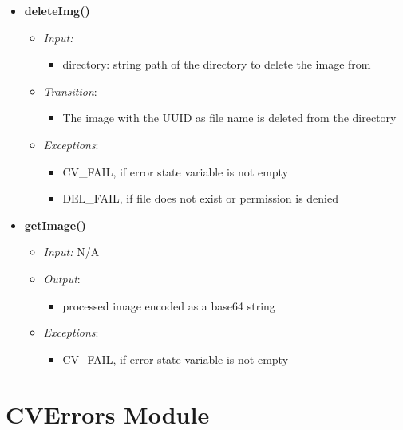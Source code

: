 \documentclass[11pt]{article}
\begin{document}
\begin{itemize}
		\item \textbf{deleteImg()}
		\begin{itemize}
		    \item[] \textit{Input: } 		    
		    \begin{itemize}
		        \item directory: string path of the directory to delete the image from
		    \end{itemize}
		    \item[] \textit{Transition}: 
		    \begin{itemize}
		        \item The image with the UUID as file name is deleted from the directory
		    \end{itemize}
		    
		    \item[] \textit{Exceptions}:
		    \begin{itemize}
		        \item CV\_FAIL, if error state variable is not empty
		        \item DEL\_FAIL, if file does not exist or permission is denied
		    \end{itemize}
		\end{itemize}		
		
		\item \textbf{getImage()}
		\begin{itemize}
		    \item[] \textit{Input: } N/A
		    \item[] \textit{Output}: 
		    \begin{itemize}
		        \item processed image encoded as a base64 string
		    \end{itemize}
		    
		    \item[] \textit{Exceptions}:
		    \begin{itemize}
		        \item CV\_FAIL, if error state variable is not empty
		    \end{itemize}
		\end{itemize}	
		
    \end{itemize}			
    

\section{CVErrors Module}
\end{document}
